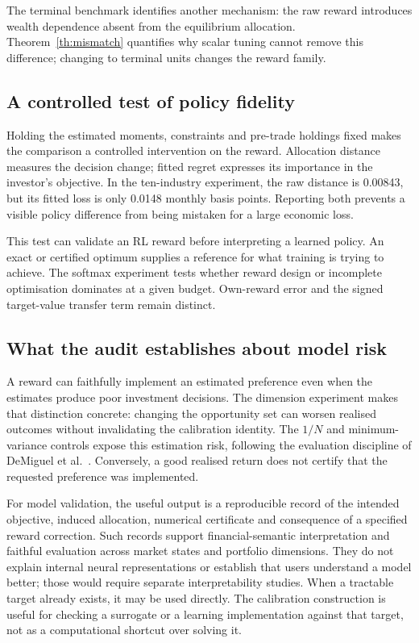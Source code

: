 \documentclass[sigconf,anonymous,review]{acmart}
\begin{document}
The terminal benchmark identifies another mechanism: the raw reward introduces wealth dependence absent from the equilibrium allocation. Theorem~\ref{th:mismatch} quantifies why scalar tuning cannot remove this difference; changing to terminal units changes the reward family.

\subsection{A controlled test of policy fidelity}
Holding the estimated moments, constraints and pre-trade holdings fixed makes the comparison a controlled intervention on the reward. Allocation distance measures the decision change; fitted regret expresses its importance in the investor's objective. In the ten-industry experiment, the raw distance is 0.00843, but its fitted loss is only 0.0148 monthly basis points. Reporting both prevents a visible policy difference from being mistaken for a large economic loss.

This test can validate an RL reward before interpreting a learned policy. An exact or certified optimum supplies a reference for what training is trying to achieve. The softmax experiment tests whether reward design or incomplete optimisation dominates at a given budget. Own-reward error and the signed target-value transfer term remain distinct.

\subsection{What the audit establishes about model risk}
A reward can faithfully implement an estimated preference even when the estimates produce poor investment decisions. The dimension experiment makes that distinction concrete: changing the opportunity set can worsen realised outcomes without invalidating the calibration identity. The $1/N$ and minimum-variance controls expose this estimation risk, following the evaluation discipline of DeMiguel et al.~\cite{demiguel2009}. Conversely, a good realised return does not certify that the requested preference was implemented.

For model validation, the useful output is a reproducible record of the intended objective, induced allocation, numerical certificate and consequence of a specified reward correction. Such records support financial-semantic interpretation and faithful evaluation across market states and portfolio dimensions. They do not explain internal neural representations or establish that users understand a model better; those would require separate interpretability studies. When a tractable target already exists, it may be used directly. The calibration construction is useful for checking a surrogate or a learning implementation against that target, not as a computational shortcut over solving it.
\end{document}
